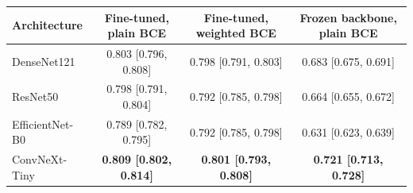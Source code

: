\begin{tabular}{lccc}
\toprule
Architecture & Fine-tuned, plain BCE & Fine-tuned, weighted BCE & Frozen backbone, plain BCE \\
\midrule
DenseNet121 & 0.803 [0.796, 0.808] & 0.798 [0.791, 0.803] & 0.683 [0.675, 0.691] \\
ResNet50 & 0.798 [0.791, 0.804] & 0.792 [0.785, 0.798] & 0.664 [0.655, 0.672] \\
EfficientNet-B0 & 0.789 [0.782, 0.795] & 0.792 [0.785, 0.798] & 0.631 [0.623, 0.639] \\
ConvNeXt-Tiny & \textbf{0.809 [0.802, 0.814]} & \textbf{0.801 [0.793, 0.808]} & \textbf{0.721 [0.713, 0.728]} \\
\bottomrule
\end{tabular}
